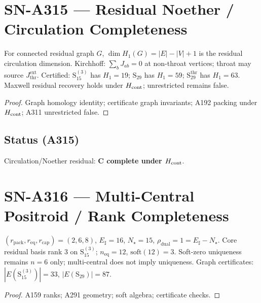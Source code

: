 \section{SN-A315 --- Residual Noether / Circulation Completeness}
\label{sec:SN-A315}

\begin{theorem}
\label{thm:A315}
For connected residual graph $G$, $\dim H_1(G)=|E|-|V|+1$ is the residual circulation dimension.
Kirchhoff: $\sum_b J_{ab}=0$ at non-throat vertices; throat may source $J_{\mathrm{thr}}^{\mathrm{ext}}$.
Certified: $\mathrm{S}_{15}^{(3)}$ has $H_1=19$; $\mathrm{S}_{29}$ has $H_1=59$;
$\mathrm{S}_{29}^{\mathrm{thr}}$ has $H_1=63$. Maxwell residual recovery holds under $H_{\rm cont}$;
unrestricted remains false.
\end{theorem}

\begin{proof}
Graph homology identity; certificate graph invariants; A192 packing under $H_{\rm cont}$; A311 unrestricted false.
\end{proof}

\subsection*{Status (A315)}
Circulation/Noether residual: \textbf{C complete under $H_{\rm cont}$}.

\section{SN-A316 --- Multi-Central Positroid / Rank Completeness}
\label{sec:SN-A316}

\begin{theorem}
\label{thm:A316}
$(r_{\mathrm{pack}},r_{\mathrm{eq}},r_{\mathrm{cap}})=(2,6,8)$, $E_\sharp=16$, $N_\star=15$,
$\rho_{\mathrm{dual}}=1=E_\sharp-N_\star$. Core residual basis rank $3$ on $\mathrm{S}_{15}^{(3)}$;
$n_{\mathrm{eq}}=12$, $\mathrm{soft}(12)=3$. Soft-zero uniqueness remains $n=6$ only;
multi-central does not imply uniqueness. Graph certificates: $|E(\mathrm{S}_{15}^{(3)})|=33$,
$|E(\mathrm{S}_{29})|=87$.
\end{theorem}

\begin{proof}
A159 ranks; A291 geometry; soft algebra; certificate checks.
\end{proof}

